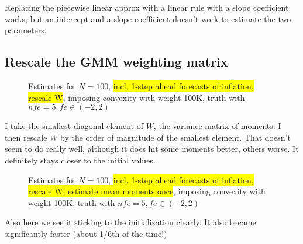 \documentclass[11pt]{article}
\def \myFigPath {../../figures/}
\renewcommand{\[}{\begin{equation}}
\renewcommand{\]}{\end{equation}}
\def\myTinyFigScale{0.16}
\begin{document}
Replacing the piecewise linear approx with a linear rule with a slope coefficient works, but an intercept and a slope coefficient doesn't work to estimate the two parameters. 

\newpage
\subsection{Rescale the GMM weighting matrix}

\begin{figure}[h!]
{}
\caption{Estimates for $N=100$, \colorbox{yellow}{incl. 1-step ahead forecasts of inflation, rescale W}, imposing convexity with weight 100K, truth with $nfe=5, fe \in(-2,2)$}
\end{figure}

I take the smallest diagonal element of $W$, the variance matrix of moments. I then rescale $W$ by the order of magnitude of the smallest element. That doesn't seem to do really well, although it does hit some moments better, others worse. It definitely stays closer to the initial values.

\begin{figure}[h!]
{}
\caption{Estimates for $N=100$, \colorbox{yellow}{incl. 1-step ahead forecasts of inflation, rescale W, estimate mean moments once}, imposing convexity with weight 100K, truth with $nfe=5, fe \in(-2,2)$}
\end{figure}

Also here we see it sticking to the initialization clearly. It also became significantly faster (about 1/6th of the time!)
\end{document}
